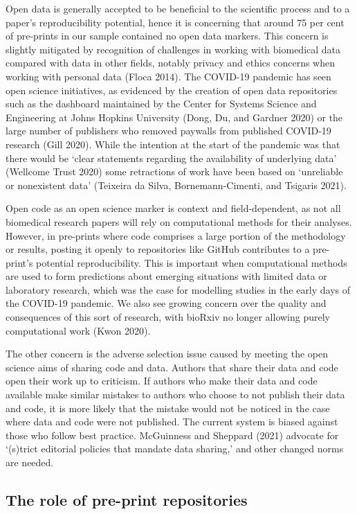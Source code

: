 \documentclass[
]{article}
\begin{document}
Open data is generally accepted to be beneficial to the scientific process and to a paper's reproducibility potential, hence it is concerning that around 75 per cent of pre-prints in our sample contained no open data markers. This concern is slightly mitigated by recognition of challenges in working with biomedical data compared with data in other fields, notably privacy and ethics concerns when working with personal data (Floca 2014). The COVID-19 pandemic has seen open science initiatives, as evidenced by the creation of open data repositories such as the dashboard maintained by the Center for Systems Science and Engineering at Johns Hopkins University (Dong, Du, and Gardner 2020) or the large number of publishers who removed paywalls from published COVID-19 research (Gill 2020). While the intention at the start of the pandemic was that there would be `clear statements regarding the availability of underlying data' (Wellcome Trust 2020) some retractions of work have been based on `unreliable or nonexistent data' (Teixeira da Silva, Bornemann-Cimenti, and Tsigaris 2021).

Open code as an open science marker is context and field-dependent, as not all biomedical research papers will rely on computational methods for their analyses. However, in pre-prints where code comprises a large portion of the methodology or results, posting it openly to repositories like GitHub contributes to a pre-print's potential reproducibility. This is important when computational methods are used to form predictions about emerging situations with limited data or laboratory research, which was the case for modelling studies in the early days of the COVID-19 pandemic. We also see growing concern over the quality and consequences of this sort of research, with bioRxiv no longer allowing purely computational work (Kwon 2020).

The other concern is the adverse selection issue caused by meeting the open science aims of sharing code and data. Authors that share their data and code open their work up to criticism. If authors who make their data and code available make similar mistakes to authors who choose to not publish their data and code, it is more likely that the mistake would not be noticed in the case where data and code were not published. The current system is biased against those who follow best practice. McGuinness and Sheppard (2021) advocate for `(s)trict editorial policies that mandate data sharing,' and other changed norms are needed.

\hypertarget{the-role-of-pre-print-repositories}{%
\subsection{The role of pre-print repositories}\label{the-role-of-pre-print-repositories}}
\end{document}
